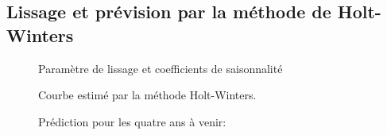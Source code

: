 	\subsection{Lissage et prévision par la méthode de Holt-Winters}
	\begin{figure}[H]
		\centering
		\caption{Paramètre de lissage et coefficients de saisonnalité}
		\label{fig:hw_param}
	\end{figure}

	\begin{figure}[H]
		\centering
		\caption{Courbe estimé par la méthode Holt-Winters.}
		\label{fig:hw_for}
	\end{figure}

	\begin{figure}[H]
		\centering
		\caption{Prédiction pour les quatre ans à venir:}
		\label{fig:forecast}
	\end{figure}
	
